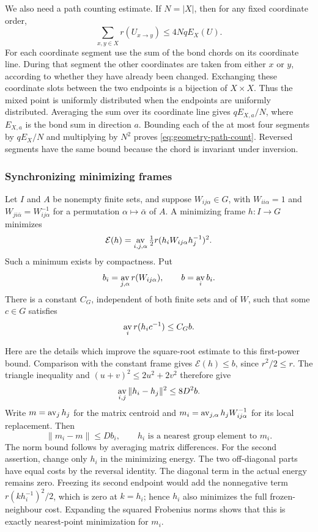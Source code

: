 We also need a path counting estimate. If $N=|X|$, then for any fixed
coordinate order,
\begin{equation}\label{eq:geometry-path-count}
 \sum_{x,y\in X}r(U_{x\to y})\le4Nq E_X(U).
\end{equation}
For each coordinate segment use the sum of the bond chords on its
coordinate line. During that segment the other coordinates are taken
from either $x$ or $y$, according to whether they have already been
changed. Exchanging these coordinate slots between the two endpoints
is a bijection of $X\times X$. Thus the mixed point is uniformly
distributed when the endpoints are uniformly distributed. Averaging
the sum over its coordinate line gives $qE_{X,a}/N$, where $E_{X,a}$
is the bond sum in direction $a$. Bounding each of the at most four
segments by $qE_X/N$ and multiplying by $N^2$ proves
\eqref{eq:geometry-path-count}. Reversed segments have the same bound
because the chord is invariant under inversion.

\subsubsection{Synchronizing minimizing frames}
Let $I$ and $A$ be nonempty finite sets, and suppose
$W_{ij\alpha}\in G$, with $W_{ii\alpha}=1$ and
$W_{ji\bar\alpha}=W_{ij\alpha}^{-1}$ for a permutation
$\alpha\mapsto\bar\alpha$ of $A$. A minimizing frame $h:I\to G$
minimizes
\[
 \mathcal E(h)=\mathop{\rm av}_{i,j,\alpha}
       \tfrac12 r(h_iW_{ij\alpha}h_j^{-1})^2.
\]
Such a minimum exists by compactness. Put
\[
 b_i=\mathop{\rm av}_{j,\alpha}r(W_{ij\alpha}),\qquad
 b=\mathop{\rm av}_i b_i.
\]
There is a constant $C_G$, independent of both finite sets and of $W$,
such that some $c\in G$ satisfies
\begin{equation}\label{eq:geometry-cluster}
 \mathop{\rm av}_i r(h_ic^{-1})\le C_G b.
\end{equation}

Here are the details which improve the square-root estimate to this
first-power bound. Comparison with the constant frame gives
$\mathcal E(h)\le b$, since $r^2/2\le r$. The triangle inequality and
$(u+v)^2\le2u^2+2v^2$ therefore give
\begin{equation}\label{eq:geometry-pair-square}
 \mathop{\rm av}_{i,j}\|h_i-h_j\|^2\le8D^2b.
\end{equation}
Write $m=\mathop{\rm av}_j h_j$ for the matrix centroid and
$m_i=\mathop{\rm av}_{j,\alpha}h_jW_{ij\alpha}^{-1}$ for its local
replacement. Then
\begin{equation}\label{eq:geometry-feedback}
 \|m_i-m\|\le Db_i,
 \qquad h_i\text{ is a nearest group element to }m_i.
\end{equation}
The norm bound follows by averaging matrix differences. For the second
assertion, change only $h_i$ in the minimizing energy. The two
 off-diagonal parts have equal costs by the reversal identity. The
 diagonal term in the actual energy remains zero. Freezing its second
 endpoint would add the nonnegative term
$r(kh_i^{-1})^2/2$, which is zero at $k=h_i$; hence $h_i$ also minimizes
the full frozen-neighbour cost. Expanding the squared Frobenius norms
shows that this is exactly nearest-point minimization for $m_i$.


